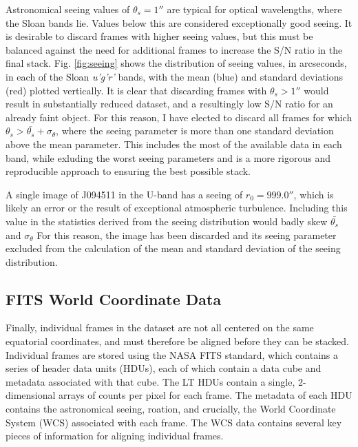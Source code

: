 \documentclass[a4paper,11pt]{article}
\begin{document}
Astronomical seeing values of $\theta_s=1''$ are typical for optical wavelengths, where the Sloan bands lie. Values below this are considered exceptionally good seeing.\cite{mcclure_2019}\cite{lawrence_2014} It is desirable to discard frames with higher seeing values, but this must be balanced against the need for additional frames to increase the S/N ratio in the final stack. Fig. \ref{fig:seeing} shows the distribution of seeing values, in arcseconds, in each of the Sloan \textit{u'g'r'} bands, with the mean (blue) and standard deviations (red) plotted vertically. It is clear that discarding frames with $\theta_s>1''$ would result in substantially reduced dataset, and a resultingly low S/N ratio for an already faint object. For this reason, I have elected to discard all frames for which $\theta_s>\bar{\theta_s}+\sigma_\theta$, where the seeing parameter is more than one standard deviation above the mean parameter. This includes the most of the available data in each band, while exluding the worst seeing parameters and is a more rigorous and reproducible approach to ensuring the best possible stack.

A single image of J094511 in the U-band has a seeing of $r_0=999.0''$, which is likely an error or the result of exceptional atmospheric turbulence. Including this value in the statistics derived from the seeing distribution would badly skew $\bar{\theta_s}$ and $\sigma_\theta$ For this reason, the image has been discarded and its seeing parameter excluded from the calculation of the mean and standard deviation of the seeing distribution.

\subsection{FITS World Coordinate Data}

Finally, individual frames in the dataset are not all centered on the same equatorial coordinates, and must therefore be aligned before they can be stacked. Individual frames are stored using the NASA FITS standard, which contains a series of header data units (HDUs), each of which contain a data cube and metadata associated with that cube.\cite{FITS_standard} The LT HDUs contain a single, 2-dimensional arrays of counts per pixel for each frame. The metadata of each HDU contains the astronomical seeing, roation, and crucially, the World Coordinate System (WCS) associated with each frame.\cite{greisen_2002} The WCS data contains several key pieces of information for aligning individual frames.
\end{document}
